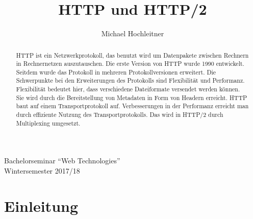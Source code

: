 \documentclass{llncs}
\begin{document}
\title{HTTP und HTTP/2}
\author{Michael Hochleitner}

\maketitle 
\begin{center}
Bachelorseminar ``Web Technologies'' \\
Wintersemester 2017/18
\end{center}

\begin{abstract}
HTTP ist ein Netzwerkprotokoll, das benutzt wird um Datenpakete zwischen Rechnern in Rechnernetzen auszutauschen. Die erste Version von HTTP wurde 1990 entwickelt. Seitdem wurde das Protokoll in mehreren Protokollversionen erweitert. Die Schwerpunkte bei den Erweiterungen des Protokolls sind Flexibilität und Performanz. Flexibilität bedeutet hier, dass verschiedene Dateiformate versendet werden können. Sie wird durch die Bereitstellung von Metadaten in Form von Headern erreicht. HTTP baut auf einem Transportprotokoll auf. Verbesserungen in der Performanz erreicht man durch effiziente Nutzung des Transportprotokolls. Das wird in HTTP/2 durch Multiplexing umgesetzt.
\end{abstract}

\section{Einleitung}
\end{document}
